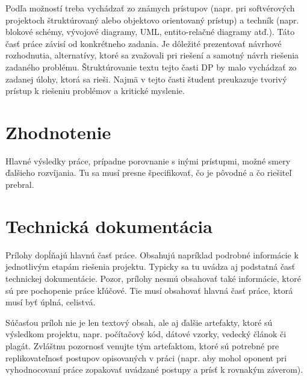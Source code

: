 \documentclass[12pt, a4paper, twoside, openright, slovak]{book}
\newcommand{\emptypage}{\newpage\thispagestyle{empty}\mbox{}\newpage}
\begin{document}
Podľa možností treba vychádzať zo známych prístupov (napr. pri softvérových projektoch štruktúrovaný alebo objektovo orientovaný prístup) a techník (napr. blokové schémy, vývojové diagramy, UML, entito-relačné diagramy atď.). Táto časť práce závisí od konkrétneho zadania.
Je dôležité prezentovať návrhové rozhodnutia, alternatívy, ktoré sa zvažovali pri riešení a samotný návrh riešenia zadaného problému. Štruktúrovanie textu tejto časti DP by malo vychádzať zo zadanej úlohy, ktorá sa rieši. Najmä v tejto časti študent preukazuje tvorivý prístup k riešeniu problémov a kritické myslenie.
\emptypage


\chapter{Zhodnotenie}
Hlavné výsledky práce, prípadne porovnanie s inými prístupmi, možné smery ďalšieho rozvíjania.
Tu sa musí presne špecifikovať, čo je pôvodné a čo riešiteľ prebral.
\emptypage


\nocite{*}
\printbibliography[title={Literatúra}]

\appendix
{}


\setcounter{figure}{0}
\chapter{Technická dokumentácia}
\renewcommand*{\thepage}{A-\arabic{page}}

Prílohy dopĺňajú hlavnú časť práce. Obsahujú napríklad podrobné informácie k jednotlivým
etapám riešenia projektu. Typicky sa tu uvádza aj podstatná časť technickej dokumentácie.
Pozor, prílohy nesmú obsahovať také informácie, ktoré sú pre pochopenie práce kľúčové. Tie
musí obsahovať hlavná časť práce, ktorá musí byť úplná, celistvá.

Súčasťou príloh nie je len textový obsah, ale aj ďalšie artefakty, ktoré sú výsledkom projektu,
napr. počítačový kód, dátové vzorky, vedecký článok či plagát. Zvláštnu pozornosť venujte tým
artefaktom, ktoré sú potrebné pre replikovateľnosť postupov opisovaných v práci (napr. aby
mohol oponent pri vyhodnocovaní práce zopakovať uvádzané postupy a prísť k rovnakým
záverom). 
\end{document}

